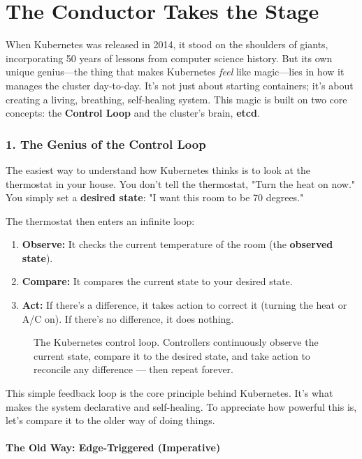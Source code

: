 \chapter{The Conductor Takes the Stage}


When Kubernetes was released in 2014, it stood on the shoulders of giants, incorporating 50 years of lessons from computer science history. But its own unique genius---the thing that makes Kubernetes \textit{feel} like magic---lies in how it manages the cluster day-to-day. It's not just about starting containers; it's about creating a living, breathing, self-healing system. This magic is built on two core concepts: the \textbf{Control Loop} and the cluster's brain, \textbf{etcd}.


\subsection{1. The Genius of the Control Loop}


The easiest way to understand how Kubernetes thinks is to look at the thermostat in your house. You don't tell the thermostat, "Turn the heat on now." You simply set a \textbf{desired state}: "I want this room to be 70 degrees."

The thermostat then enters an infinite loop:
\begin{enumerate}
\item \textbf{Observe:} It checks the current temperature of the room (the \textbf{observed state}).
\item \textbf{Compare:} It compares the current state to your desired state.
\item \textbf{Act:} If there's a difference, it takes action to correct it (turning the heat or A/C on). If there's no difference, it does nothing.
\end{enumerate}
\begin{figure}[htbp]
\centering

\caption{The Kubernetes control loop. Controllers continuously observe the current state, compare it to the desired state, and take action to reconcile any difference --- then repeat forever.}
\label{fig:5_1}
\end{figure}



This simple feedback loop is the core principle behind Kubernetes. It's what makes the system declarative and self-healing. To appreciate how powerful this is, let's compare it to the older way of doing things.

\subsubsection{\textbf{The Old Way: Edge-Triggered (Imperative)}}


